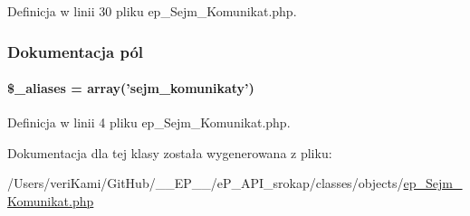 Definicja w linii 30 pliku ep\-\_\-\-Sejm\-\_\-\-Komunikat.\-php.



\subsubsection{Dokumentacja pól}
\hypertarget{classep___sejm___komunikat_ab4e31d75f0bc5d512456911e5d01366b}{
\paragraph[{\$\-\_\-aliases}]{\setlength{\rightskip}{0pt plus 5cm}\$\-\_\-aliases = array('sejm\-\_\-komunikaty')}}\label{classep___sejm___komunikat_ab4e31d75f0bc5d512456911e5d01366b}


Definicja w linii 4 pliku ep\-\_\-\-Sejm\-\_\-\-Komunikat.\-php.



Dokumentacja dla tej klasy została wygenerowana z pliku\-:\begin{DoxyCompactItemize}
\item 
/\-Users/veri\-Kami/\-Git\-Hub/\-\_\-\-\_\-\-E\-P\-\_\-\-\_\-/e\-P\-\_\-\-A\-P\-I\-\_\-srokap/classes/objects/\hyperlink{ep___sejm___komunikat_8php}{ep\-\_\-\-Sejm\-\_\-\-Komunikat.\-php}\end{DoxyCompactItemize}

